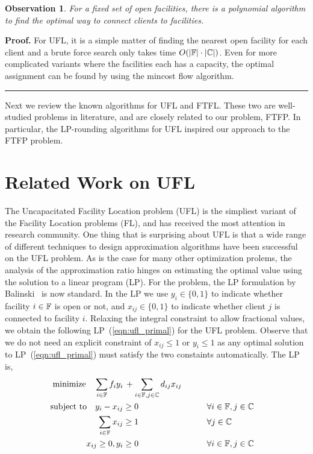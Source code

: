 \documentclass[oneside,final]{ucr}
\newtheorem{observation}[theorem]{Observation}
\newenvironment{proof}[1][Proof]{\textbf{#1.} }{\ \rule{0.5em}{0.5em}}
\begin{document}
\begin{observation}
  For a fixed set of open facilities, there is a polynomial
  algorithm to find the optimal way to connect clients to
  facilities.
\end{observation}
\begin{proof}
  For UFL, it is a simple matter of finding the nearest open
  facility for each client and a brute force search only
  takes time $O(|\mathbb{F}|\cdot |\mathbb{C}|)$. Even for
  more complicated variants where the facilities each has a
  capacity, the optimal assignment can be found by using the
  mincost flow algorithm.
\end{proof}

Next we review the known algorithms for UFL and FTFL. These
two are well-studied problems in literature, and are closely
related to our problem, FTFP. In particular, the LP-rounding
algorithms for UFL inspired our approach to the FTFP
problem.

\section{Related Work on UFL}
The Uncapacitated Facility Location problem (UFL) is the
simpliest variant of the Facility Location problems (FL),
and has received the most attention in research
community. One thing that is surprising about UFL is that a
wide range of different techniques to design approximation
algorithms have been successful on the UFL problem. As is
the case for many other optimization prolems, the analysis
of the approximation ratio hinges on estimating the optimal
value using the solution to a linear program (LP). For the
{\UFL} problem, the LP formulation by Balinski~\cite{Bal66}
is now standard. In the LP we use $y_i\in \{0,1\}$ to
indicate whether facility $i\in\mathbb{F}$ is open or not,
and $x_{ij} \in \{0,1\}$ to indicate whether client $j$ is
connected to facility $i$. Relaxing the integral constraint
to allow fractional values, we obtain the following
LP~(\ref{eqn:ufl_primal}) for the UFL problem. Observe that
we do not need an explicit constraint of $x_{ij} \leq 1$ or
$y_i \leq 1$ as any optimal solution to
LP~(\ref{eqn:ufl_primal}) must satisfy the two constaints
automatically. The LP is,
\begin{alignat}{3}
  \textrm{minimize} \quad \sum_{i\in \mathbb{F}}f_iy_i &\,+
  \sum_{i\in \mathbb{F}, j\in \mathbb{C}} d_{ij}x_{ij}
  &\label{eqn:ufl_primal}
\\ \notag
\textrm{subject to} \quad y_i - x_{ij} &\geq 0 &\quad\quad & \forall i\in \mathbb{F}, j\in \mathbb{C} 
\\ \notag
\sum_{i\in \mathbb{F}} x_{ij} &\geq 1 & &\forall j\in \mathbb{C}
\\ \notag
x_{ij} \geq 0, y_i &\geq 0 & &\forall i\in \mathbb{F}, j\in \mathbb{C} 
\\ \notag
\end{alignat}
\end{document}
